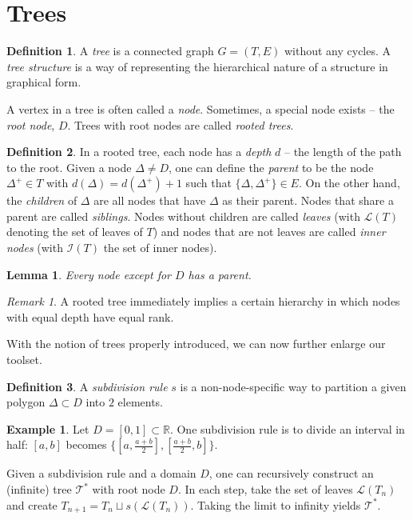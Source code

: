 \documentclass[11pt]{report}
\newtheorem{lemma}{Lemma}
\theoremstyle{definition}
\newtheorem{definition}{Definition}
\newtheorem*{example}{Example}
\theoremstyle{remark}
\newtheorem*{remark}{Remark}
\newcommand{\R}{\mathbb{R}}
\newcommand{\T}{\mathcal{T}}
\renewcommand{\L}{\mathcal{L}}
\newcommand{\I}{\mathcal{I}}
\newcommand{\node}{\Delta}
\begin{document}
\section{Trees}
\begin{definition}
A \emph{tree} is a connected graph $G = (T,E)$ without any cycles. A \emph{tree structure} is a way of representing the hierarchical nature of a structure in graphical form.

A vertex in a tree is often called a \emph{node}. Sometimes, a special node exists -- the \emph{root node}, $D$. Trees with root nodes are called \emph{rooted trees}.
\end{definition}
\begin{definition}
  In a rooted tree, each node has a \emph{depth} $d$ -- the length of the path to the root. Given a node $\node \not= D$, one can define the \emph{parent} to be the node $\node^+ \in T$ with $d(\node) = d(\node^+) + 1$ such that $\{\node, \node^+\} \in E$. On the other hand, the \emph{children} of $\node$ are all nodes that have $\node$ as their parent. Nodes that share a parent are called \emph{siblings}. Nodes without children are called \emph{leaves} (with $\L(T)$ denoting the set of leaves of $T$) and nodes that are not leaves are called \emph{inner nodes} (with $\I(T)$ the set of inner nodes).
\end{definition}
\begin{lemma} Every node except for $D$ has a parent. \end{lemma}
\begin{remark}
  A rooted tree immediately implies a certain hierarchy in which nodes with equal depth have equal rank.
\end{remark}

With the notion of trees properly introduced, we can now further enlarge our toolset.
\begin{definition}
  A \emph{subdivision rule} $s$ is a non-node-specific way to partition a given polygon $\node \subset D$ into $2$ elements.
\end{definition}
\begin{example}
  Let $D = [0,1] \subset \R$. One subdivision rule is to divide an interval in half: $[a,b]$ becomes $\{[a,\frac{a+b}{2}], [\frac{a+b}{2}, b]\}$.
\end{example}

Given a subdivision rule and a domain $D$, one can recursively construct an (infinite) tree $\T^*$ with root node $D$. In each step, take the set of leaves $\L(T_n)$ and create $T_{n+1} = T_n \sqcup s(\L(T_n))$. Taking the limit to infinity yields $\T^*$.
\end{document}
